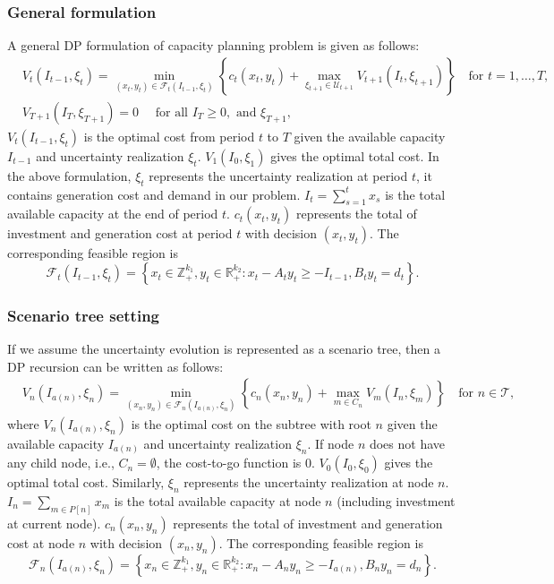 \documentclass[10pt]{article}
\theoremstyle{plain}
\theoremstyle{definition}
\theoremstyle{remark}
\newcommand{\T}{\mathcal{T}}
\newcommand{\Z}{\mathbb{Z}}
\newcommand{\R}{\mathbb{R}}
\begin{document}
\subsubsection*{General formulation}
A general DP formulation of capacity planning problem is given as follows:
\begin{align*}
  & V_t(I_{t-1},\xi_t) =
  \min_{(x_t,y_t)\in \mathcal{F}_t(I_{t-1},\xi_t)} \left\{c_t(x_t,y_t)+\max_{\xi_{t+1}\in \mathcal{U}_{t+1}}V_{t+1}(I_t,\xi_{t+1})\right\} \quad \text{for } t=1,\dots, T,\\
  & V_{T+1}(I_T,\xi_{T+1}) = 0\quad \text{ for all } I_T\ge 0, \text{ and } \xi_{T+1},
\end{align*}
$V_t(I_{t-1},\xi_t)$ is the optimal cost from period $t$ to $T$ given the available capacity $I_{t-1}$ and uncertainty realization $\xi_t$.
$V_1(I_0, \xi_1)$ gives the optimal total cost.
In the above formulation, $\xi_t$ represents the uncertainty realization at period $t$, it contains generation cost and demand in our problem.
$I_t = \sum_{s=1}^{t}x_s$ is the total available capacity at the end of period $t$.
$c_t(x_t,y_t)$ represents the total of investment and generation cost at period $t$ with decision $(x_t,y_t)$. The corresponding feasible region is
\[\mathcal{F}_t(I_{t-1},\xi_t) = \left\{x_t\in \Z^{k_1}_+, y_t\in \R^{k_2}_+:
x_t - A_ty_t \ge -I_{t-1}, B_ty_t = d_t\right\}.\]

\subsubsection*{Scenario tree setting}
If we assume the uncertainty evolution is represented as a scenario tree, then a DP recursion
can be written as follows:
\begin{align*}
	& V_n(I_{a(n)},\xi_n) =
	\min_{(x_n,y_n)\in \mathcal{F}_n(I_{a(n)},\xi_n)} \left\{c_n(x_n,y_n)+
	\max_{m\in C_n}V_{m}(I_{n},\xi_{m})\right\} \quad \text{for } n\in \T,
\end{align*}
where $V_n(I_{a(n)},\xi_n)$ is the optimal cost on the subtree with root $n$ given the available capacity $I_{a(n)}$
and uncertainty realization $\xi_n$.
If node $n$ does not have any child node, i.e., $C_n=\emptyset$, the cost-to-go function is $0$.
$V_0(I_0,\xi_0)$ gives the optimal total cost.
Similarly, $\xi_n$ represents the uncertainty realization at node $n$.
$I_n = \sum_{m\in P[n]}x_m$ is the total available capacity at node $n$ (including investment at current node).
$c_n(x_n,y_n)$ represents the total of investment and generation cost at node $n$ with decision $(x_n,y_n)$.
The corresponding feasible region is
\[\mathcal{F}_n(I_{a(n)},\xi_n) = \left\{x_n\in \Z^{k_1}_+, y_n\in \R^{k_2}_+:
x_n - A_{n}y_n \ge -I_{a(n)}, B_ny_n = d_n\right\}.\]
\end{document}
